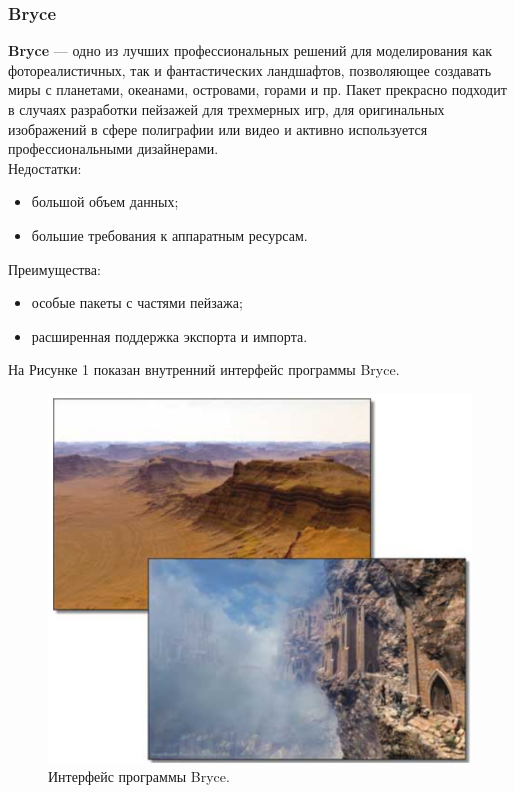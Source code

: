 \documentclass[a4paper, 10pt]{article}
\begin{document}
	\subsubsection{Bryce}
	{\bf Bryce} — одно из лучших профессиональных решений для моделирования как фотореалистичных, так и фантастических ландшафтов, позволяющее создавать миры с планетами, океанами, островами, горами и пр. Пакет прекрасно подходит в случаях разработки пейзажей для трехмерных игр, для оригинальных изображений в сфере полиграфии или видео и активно используется профессиональными дизайнерами.
	\\Недостатки:
	\begin{itemize}
		\item большой объем данных;
		\item большие требования к аппаратным ресурсам.
	\end{itemize}
	Преимущества:
	\begin{itemize}
		\item особые пакеты с частями пейзажа;
		\item расширенная поддержка экспорта и импорта.
	\end{itemize}
	На Рисунке 1 показан внутренний интерфейс программы Bryce.
	\clearpage
	\newpage
	\begin{figure}[h!]
		\centering
		\includegraphics[scale=0.8]{bryce}
		\centering\caption{Интерфейс программы Bryce.}
	\end{figure}
\end{document}
